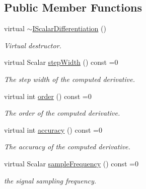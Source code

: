 \subsection*{Public Member Functions}
\begin{DoxyCompactItemize}
\item 
virtual \hyperlink{classow__core_1_1IScalarDifferentiation_aace718878c6ee80403012b69a09e8498}{$\sim$\+I\+Scalar\+Differentiation} ()\hypertarget{classow__core_1_1IScalarDifferentiation_aace718878c6ee80403012b69a09e8498}{}\label{classow__core_1_1IScalarDifferentiation_aace718878c6ee80403012b69a09e8498}

\begin{DoxyCompactList}\small\item\em Virtual destructor. \end{DoxyCompactList}\item 
virtual Scalar \hyperlink{classow__core_1_1IScalarDifferentiation_af10e7ac83fac4c77c4889b55cc763e9b}{step\+Width} () const =0
\begin{DoxyCompactList}\small\item\em The step width of the computed derivative. \end{DoxyCompactList}\item 
virtual int \hyperlink{classow__core_1_1IScalarDifferentiation_a147e3ca58aaff5c16f368fb45f2cbbcb}{order} () const =0
\begin{DoxyCompactList}\small\item\em The order of the computed derivative. \end{DoxyCompactList}\item 
virtual int \hyperlink{classow__core_1_1IScalarDifferentiation_a9226bf072ff034a1dd0d3562b3eedd55}{accuracy} () const =0
\begin{DoxyCompactList}\small\item\em The accuracy of the computed derivative. \end{DoxyCompactList}\item 
virtual Scalar \hyperlink{classow__core_1_1IScalarDifferentiation_ab0b668150354d2cb35811326a2516043}{sample\+Frequency} () const =0\hypertarget{classow__core_1_1IScalarDifferentiation_ab0b668150354d2cb35811326a2516043}{}\label{classow__core_1_1IScalarDifferentiation_ab0b668150354d2cb35811326a2516043}

\begin{DoxyCompactList}\small\item\em the signal sampling frequency. \end{DoxyCompactList}\end{DoxyCompactItemize}


